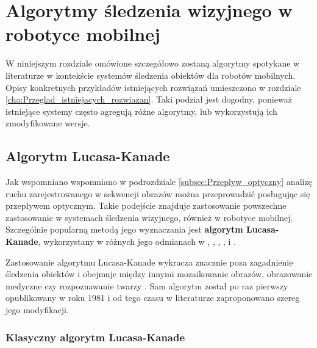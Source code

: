 \chapter{Algorytmy śledzenia wizyjnego w robotyce mobilnej}
\label{cha:Algorymty_sledzenia_wizyjnego_w_robotyce_mobilnej}

W niniejszym rozdziale omówione szczegółowo zostaną algorytmy spotykane w literaturze w kontekście systemów śledzenia obiektów dla robotów mobilnych. Opisy konkretnych przykładów istniejących rozwiązań umieszczono w rozdziale \ref{cha:Przeglad_istniejacych_rozwiazan}. Taki podział jest dogodny, ponieważ  istniejące systemy często agregują różne algorytmy, lub wykorzystują ich zmodyfikowane wersje.

\section{Algorytm Lucasa-Kanade}
\label{sec:Algorytm_Lucasa_Kanade}
Jak wspomniano wspomniano w podrozdziale \ref{subsec:Przeplyw_optyczny} analizę ruchu zarejestrowanego w sekwencji obrazów można przeprowadzić posługując się przepływem optycznym. Takie podejście znajduje zastosowanie powszechne zastosowanie w systemach śledzenia wizyjnego, również w robotyce mobilnej. Szczególnie popularną metodą jego wyznaczania jest \textbf{algorytm Lucasa-Kanade}, wykorzystany w różnych jego odmianach w \cite{Campoy2009}, \cite{Fernandez-Caballero2010}, \cite{Liem2008}, \cite{Markovic2014}, \cite{Olivares-Mendez2009} i \cite{Sadeghi-Tehran2014}.

Zastosowanie algorytmu Lucasa-Kanade wykracza znacznie poza zagadnienie śledzenia obiektów i obejmuje między innymi mozaikowanie obrazów, obrazowanie medyczne czy rozpoznawanie twarzy \cite{Baker2004}. Sam algorytm został po raz pierwszy opublikowany w roku 1981 i od tego czasu w literaturze zaproponowano szereg jego modyfikacji.

\subsection{Klasyczny algorytm Lucasa-Kanade}
\label{subsec:Klasyczny_algorytm_Lucasa_Kanade}

